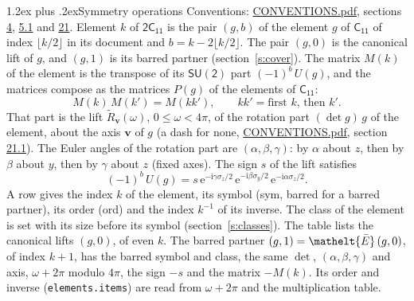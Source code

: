 \documentclass[10pt,a4paper]{article}
\makeatletter
\renewcommand\section{\@startsection{section}{1}{\z@}{-3ex plus -1ex minus -.2ex}%
  {1.2ex plus .2ex}{\normalfont\large\sffamily\bfseries\color{parttitle}}}
\numberwithin{equation}{section}
\newcommand{\eltfont}[1]{{\let\sigma\eltsigma\mathelt{#1}}}
\newcommand{\grp}[1]{\mathsf{#1}}
\newcommand{\elt}[1]{\eltfont{#1}}
\newcommand{\vv}{\mathbf{v}}
\newcommand{\iunit}{\mathrm{i}}
\newcommand{\expe}{\mathrm{e}}
\newcommand{\barred}[1]{\bar{#1}}
\newcommand{\lift}[1]{\tilde{#1}}
\newcommand{\pauli}[1]{\sigma_{#1}}
\makeatother
\begin{document}
\section{Symmetry operations}\label{s:elements}
Conventions: \href{../../CONVENTIONS.pdf}{CONVENTIONS.pdf}, sections \href{../../../rotation/CONVENTIONS.pdf\#conv.4}{4}, \href{../../../rotation/CONVENTIONS.pdf\#conv.5.1}{5.1} and \href{../../CONVENTIONS.pdf\#conv.21}{21}.
\leavevmode\label{n:index.element}\label{n:element.g}Element $k$ of $\grp{2C_{11}}$ is the pair $(g, b)$ of the element $g$ of \href{../../../rotation/data/pdf/C11.pdf}{$\grp{C_{11}}$} of index $\lfloor k/2\rfloor$ in its document and $b = k - 2\lfloor k/2\rfloor$. The pair $(g, 0)$ is the canonical lift of $g$, and $(g, 1)$ is its barred partner (section~\ref{s:cover}). \label{n:matrix.element.pin}\label{n:matrix.element}The matrix $M(k)$ of the element is the transpose of its $\grp{SU(2)}$ part $(-1)^{b}\,U(g)$, and the matrices compose as the matrices $P(g)$ of the elements of $\grp{C_{11}}$:
\begin{equation}\label{e:mprod}M(k)\,M(k') = M(kk'),\qquad kk' = \text{first } k\text{, then } k'.\end{equation}
\leavevmode\label{n:angle.omega}\label{n:vector.axis}\label{n:vector.pole}That part is the lift $\lift{R}_{\vv}(\omega)$, $0 \le \omega < 4\pi$, of the rotation part $(\det g)\,g$ of the element, about the axis $\vv$ of $g$ (a dash for none, \href{../../CONVENTIONS.pdf}{CONVENTIONS.pdf}, section \href{../../CONVENTIONS.pdf\#conv.21.1}{21.1}). \label{n:angle.euler.alpha}\label{n:angle.euler.beta}\label{n:angle.euler.gamma}\label{n:vector.coordinates}The Euler angles of the rotation part are $(\alpha,\beta,\gamma)$: by $\alpha$ about $z$, then by $\beta$ about $y$, then by $\gamma$ about $z$ (fixed axes). \label{n:local.euler.sign}The sign $s$ of the lift satisfies
\begin{equation}\label{e:euler}(-1)^{b}\,U(g) = s\,\expe^{-\iunit\gamma\pauli{z}/2}\,\expe^{-\iunit\beta\pauli{y}/2}\,\expe^{-\iunit\alpha\pauli{z}/2}.\end{equation}
\leavevmode\label{n:index.element.inverse}\label{n:head.sym}\label{n:head.ord}A row gives the index $k$ of the element, its symbol (sym, barred for a barred partner), its order (ord) and the index $k^{-1}$ of its inverse. \label{n:head.class}The class of the element is set with its size before its symbol (section~\ref{s:classes}).
The table lists the canonical lifts $(g, 0)$, of even $k$. The barred partner $(g, 1) = \elt{\barred{E}}\,(g, 0)$, of index $k + 1$, has the barred symbol and class, the same $\det$, $(\alpha,\beta,\gamma)$ and axis, $\omega + 2\pi$ modulo $4\pi$, the sign $-s$ and the matrix $-M(k)$. Its order and inverse (\texttt{elements.items}) are read from $\omega + 2\pi$ and the multiplication table.
\end{document}
